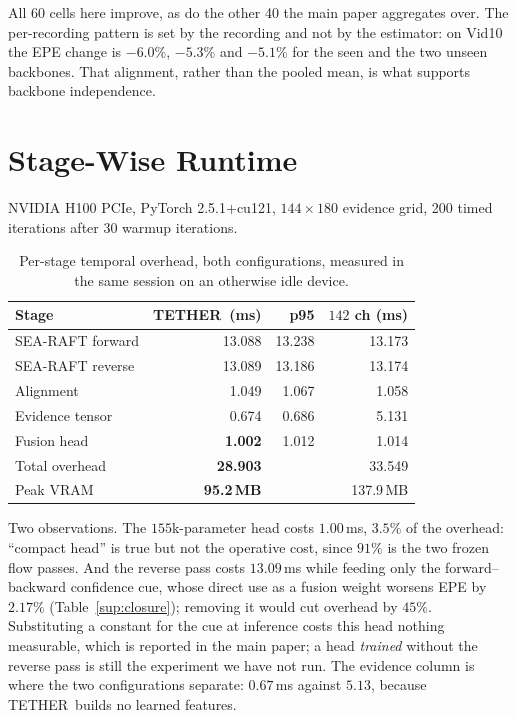 \documentclass[letterpaper,10pt,conference]{ieeeconf}
\newcommand{\steer}{\textsc{TETHER}}
\begin{document}
All 60 cells here improve, as do the other 40 the main paper aggregates
over. The per-recording pattern is set by the recording and not by the
estimator: on Vid10 the EPE change is $-6.0\%$, $-5.3\%$ and $-5.1\%$ for the
seen and the two unseen backbones. That alignment, rather than the pooled mean, is what
supports backbone independence.

\section{Stage-Wise Runtime}

NVIDIA H100 PCIe, PyTorch 2.5.1+cu121, $144\times180$ evidence grid, 200
timed iterations after 30 warmup iterations.

\begin{table}[htb]
\centering
\small
\caption{Per-stage temporal overhead, both configurations, measured in the
same session on an otherwise idle device.}
\label{sup:runtime}
\begin{tabular}{lrrr}
\toprule
Stage & \steer\ (ms) & p95 & $142$ ch (ms) \\
\midrule
SEA-RAFT forward & 13.088 & 13.238 & 13.173 \\
SEA-RAFT reverse & 13.089 & 13.186 & 13.174 \\
Alignment        & 1.049  & 1.067  & 1.058 \\
Evidence tensor  & 0.674  & 0.686  & 5.131 \\
Fusion head      & \textbf{1.002} & 1.012 & 1.014 \\
\midrule
Total overhead   & \textbf{28.903} & & 33.549 \\
Peak VRAM        & \textbf{95.2\,MB} & & 137.9\,MB \\
\bottomrule
\end{tabular}
\end{table}

Two observations. The $155$k-parameter head costs $1.00$\,ms, $3.5\%$ of the
overhead: ``compact head'' is true but not the operative cost, since $91\%$ is
the two frozen flow passes. And the reverse pass costs $13.09$\,ms while
feeding only the forward--backward confidence cue, whose direct use as a
fusion weight worsens EPE by $2.17\%$ (Table~\ref{sup:closure}); removing it
would cut overhead by $45\%$. Substituting a constant for the cue at inference
costs this head nothing measurable, which is reported in the main paper; a head
\emph{trained} without the reverse pass is still the experiment we have not
run. The evidence column is where the two configurations separate: $0.67$\,ms
against $5.13$, because \steer\ builds no learned features.
\end{document}
